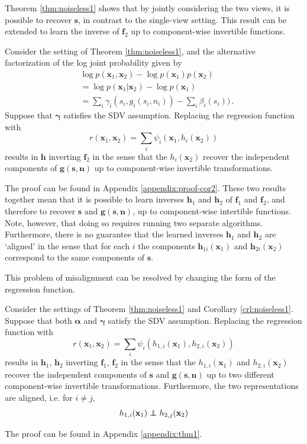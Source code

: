 \documentclass[letterpaper]{article}
\newcommand\independent{\protect\mathpalette{\protect\independenT}{\perp}}
\def\independenT#1#2{\mathrel{\rlap{$#1#2$}\mkern2mu{#1#2}}}
\theoremstyle{definition}
\begin{document}
Theorem \ref{thm:noiseless1} shows that by jointly considering the two views, it is possible to recover $\bm{s}$, in contrast to the single-view setting.
This result can be extended to learn the inverse of $\bm{f}_2$ up to component-wise invertible functions.
\begin{corollary}
\label{crl:noiseless1}
Consider the setting of Theorem \ref{thm:noiseless1}, and the alternative factorization of the log joint probability given by
\begin{align}
&\log p(\bm{x}_1, \bm{x}_2) - \log p(\bm{x}_1) p(\bm{x}_2) \nonumber \\
&= \log p(\bm{x}_1 | \bm{x}_2) - \log p(\bm{x}_1)\nonumber \\
&= \sum_i \gamma_i(s_{i}, g_i(s_i, n_i)) - \sum_i \beta_i(s_i)) \label{eq:logdens_noiesless_2}\,.
\end{align}
Suppose that $\bm{\gamma}$ satisfies the SDV assumption.
Replacing the regression function with
\begin{equation*}
r(\bm{x}_{1},\bm{x}_{2})=\sum_{i}\psi_{i}(\bm{x}_{1}, h_{i}(\bm{x}_{2}))
\end{equation*}
results in $\bm{h}$ inverting $\bm{f}_2$ in the sense that the $h_{i}(\bm{x}_2)$ recover the independent components of $\bm{g}(\bm{s}, \bm{n})$ up  to component-wise invertible transformations.
\end{corollary}The proof can be found in Appendix \ref{appendix:proof-cor2}.
These two results together mean that it is possible to learn inverses $\bm{h}_1$ and $\bm{h}_2$ of $\bm{f}_1$ and $\bm{f}_2$, and therefore to recover $\bm{s}$ and $\bm{g}(\bm{s}, \bm{n})$, up to component-wise intertible functions.
Note, however, that doing so requires running two separate algorithms.
Furthermore, there is no guarantee that the learned inverses $\bm{h}_1$ and $\bm{h}_2$ are `aligned' in the sense that for each $i$ the components $\bm{h}_{1i}(\bm{x}_1)$ and $\bm{h}_{2i}(\bm{x}_2)$ correspond to the same components of $\bm{s}$.

This problem of misalignment can be resolved by changing the form of the regression function.

\begin{theorem}\label{thm:demixing}
Consider the settings of Theorem \ref{thm:noiseless1} and Corollary \ref{crl:noiseless1}.
Suppose that both $\bm{\alpha}$ and $\bm{\gamma}$ satisfy the SDV assumption.
Replacing the regression function with
\begin{equation}\label{eqn:double-regression-fn}
r(\bm{x}_{1},\bm{x}_{2})=\sum_{i}\psi_{i}(h_{1,i}(\bm{x}_{1}),h_{2,i}(\bm{x}_{2}))
\end{equation}
results in $\bm{h}_1$, $\bm{h}_2$ inverting $\bm{f}_1$, $\bm{f}_2$ in the sense that the $h_{1,i}(\bm{x}_1)$ and $h_{2,i}(\bm{x}_2)$ recover the independent components of $\bm{s}$ and $\bm{g}(\bm{s}, \bm{n})$ up to two different component-wise invertible transformations. Furthermore, the two representations are aligned, i.e. for $i\not=j$,
\begin{equation*}
    h_{1,i}(\mathbf{x}_{1})\independent h_{2,j}(\mathbf{x}_{2})
\end{equation*}
\end{theorem}
The proof can be found in Appendix \ref{appendix:thm1}.
\end{document}
